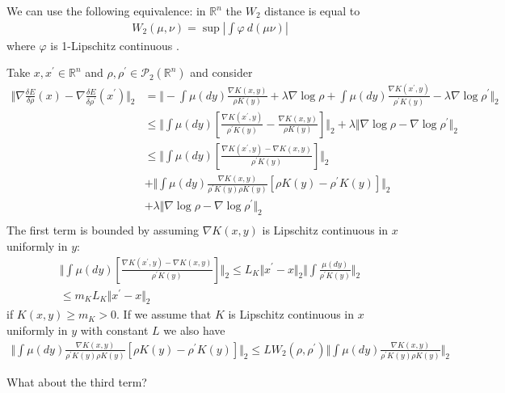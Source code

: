 \documentclass[a4paper]{article}
\newcommand{\norm}[2]{\ensuremath{\Vert #1 \Vert_{#2}}}
\newcommand{\variation}[1]{\ensuremath{\frac{\delta E}{\delta #1}}}
\def\real{\mathbb{R}}
\def\testfn{\varphi}
\begin{document}
We can use the following equivalence: in $\real^n$ the $W_2$ distance is equal to
\begin{align*}
W_2(\mu, \nu) = \sup\left\lvert \int \testfn \ d(\mu  \nu)\right\rvert
\end{align*}
where $\testfn$ is 1-Lipschitz continuous \citep[page 112]{santambrogio2017euclidean}.

Take $x, x^\prime\in \real^n$  and $\rho, \rho^\prime \in \mathcal{P}_2(\real^n)$ and consider
\begin{align*}
\norm{ \nabla\variation{\rho}(x) - \nabla\variation{\rho^\prime}(x^\prime)}{2} &= \norm{- \int\mu\left(dy\right)\frac{\nabla K(x,y)}{\rho K(y)}+\lambda\nabla\log\rho + \int\mu\left(dy\right)\frac{\nabla K(x^\prime,y)}{\rho^\prime K(y)}-\lambda\nabla\log\rho^\prime}{2}\\
&\leq \norm{\int\mu\left(dy\right)\left[\frac{\nabla K(x^\prime,y)}{\rho^\prime K(y)}- \frac{\nabla K(x,y)}{\rho K(y)}\right]}{2} +\lambda\norm{\nabla\log\rho - \nabla\log\rho^\prime}{2}\\
&\leq \norm{\int\mu\left(dy\right)\left[\frac{\nabla K(x^\prime,y) - \nabla K(x,y)}{\rho^\prime K(y)}\right]}{2}\\
& +\norm{\int\mu\left(dy\right)\frac{\nabla K(x,y)}{\rho^\prime K(y)\rho K(y)}\left[\rho K(y) - \rho^\prime K(y)\right]}{2}
\\
& +\lambda\norm{\nabla\log\rho - \nabla\log\rho^\prime}{2}\\
\end{align*}
The first term is bounded by assuming $\nabla K(x, y)$ is Lipschitz continuous in $x$ uniformly in $y$:
\begin{align*}
\norm{\int\mu\left(dy\right)\left[\frac{\nabla K(x^\prime,y) - \nabla K(x,y)}{\rho^\prime K(y)}\right]}{2} \leq L_K\norm{x^\prime - x}{2}\norm{\int\frac{\mu\left(dy\right)}{\rho^\prime K(y)}}{2}\\
\leq m_K L_K\norm{x^\prime - x}{2}
\end{align*}
if $K(x, y) \geq m_K>0$.
If we assume that $K$ is Lipschitz continuous in $x$ uniformly in $y$ with constant $L$ we also have
\begin{align*}
\norm{\int\mu\left(dy\right)\frac{\nabla K(x,y)}{\rho^\prime K(y)\rho K(y)}\left[\rho K(y) - \rho^\prime K(y)\right]}{2} \leq LW_2(\rho, \rho^\prime)\norm{\int\mu\left(dy\right)\frac{\nabla K(x,y)}{\rho^\prime K(y)\rho K(y)}}{2}
\end{align*}

What about the third term?
\end{document}
